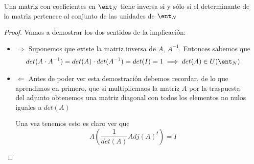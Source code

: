 \begin{prop}
Una matriz con coeficientes en $\ent_{N}$ tiene inversa si y sólo si el determinante de la matriz pertenece al conjunto de las unidades de $\ent_{N}$
\end{prop}
\begin{proof}
Vamos a demostrar los dos sentidos de la implicación:
\begin{itemize}
\item $\Rightarrow$
Suponemos que existe la matriz inversa de $A$, $A^{-1}$. Entonces sabemos que
\[det(A\cdot A^{-1})=det(A)\cdot det(A^{-1}) = det(I) = 1 \implies det(A) \in U(\ent_{N})\]
\item $\Leftarrow$
Antes de poder ver esta demostración debemos recordar, de lo que aprendimos en primero, que si multiplicmaos la matriz $A$ por la traspuesta del adjunto obtenemos una matriz diagonal con todos los elementos no nulos iguales a $det(A)$

Una vez tenemos esto es claro ver que
\[A \left( \frac{1}{det(A)}Adj(A)^t \right) = I\]
\end{itemize}
\end{proof}


